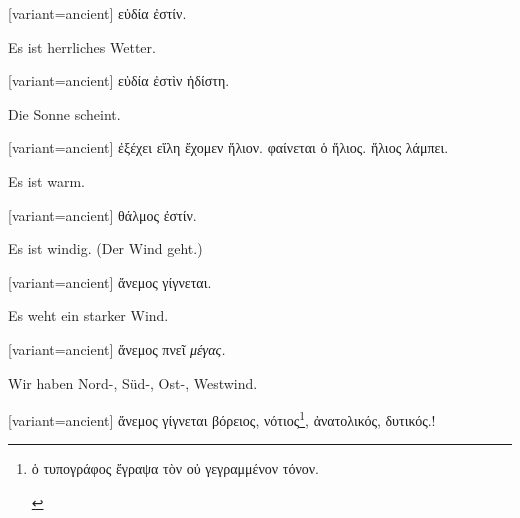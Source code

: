 \switchcolumn

\begin{greek}[variant=ancient]%
εὐδία ἐστίν.

\end{greek}%
\switchcolumn*

Es ist herrliches Wetter.

\switchcolumn

\begin{greek}[variant=ancient]%
εὐδία ἐστὶν ἡδίστη.

\end{greek}%
\switchcolumn*

Die Sonne scheint.

\switchcolumn

\begin{greek}[variant=ancient]%
ἐξέχει εἵλη ἔχομεν ἥλιον. φαίνεται ὁ ἥλιος. ἥλιος λάμπει.

\end{greek}%
\switchcolumn*

Es ist warm.

\switchcolumn

\begin{greek}[variant=ancient]%
θάλμος ἐστίν.

\end{greek}%
\switchcolumn*

Es ist windig. (Der Wind geht.)

\switchcolumn

\begin{greek}[variant=ancient]%
ἄνεμος γίγνεται.

\end{greek}%
\switchcolumn*

Es weht ein starker Wind.

\switchcolumn

\begin{greek}[variant=ancient]%
ἄνεμος πνεῖ \emph{μέγας.}

\end{greek}%
\switchcolumn*

Wir haben Nord-, Süd-, Ost-, Westwind.

\switchcolumn

\begin{greek}[variant=ancient]%
ἄνεμος γίγνεται βόρειος, νότιος\footnote{\begin{latin}%
\textgreek[variant=ancient]{ὁ τυπογράφος ἔγραψα τὸν οὐ γεγραμμένον
τόνον.}\end{latin}%
}, ἀνατολικός, δυτικός.!

\end{greek}%
\switchcolumn*

